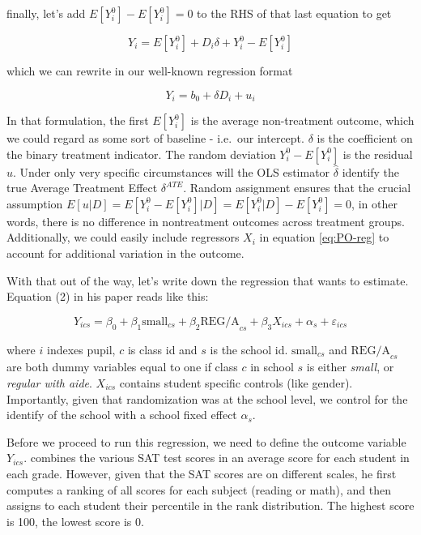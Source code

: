 \documentclass[]{book}
\begin{document}
finally, let's add \(E[Y_i^0] - E[Y_i^0]=0\) to the RHS of that last
equation to get

\begin{equation*}
Y_i = E[Y_i^0] + D_i \delta + Y_i^0 - E[Y_i^0]  
\end{equation*}

which we can rewrite in our well-known regression format

\begin{equation}
Y_i = b_0 + \delta D_i  + u_i  \label{eq:PO-reg}
\end{equation}

In that formulation, the first \(E[Y_i^0]\) is the average non-treatment
outcome, which we could regard as some sort of baseline - i.e.~our
intercept. \(\delta\) is the coefficient on the binary treatment
indicator. The random deviation \(Y_i^0 - E[Y_i^0]\) is the residual
\(u\). Under only very specific circumstances will the OLS estimator
\(\hat{\delta}\) identify the true Average Treatment Effect
\(\delta^{ATE}\). Random assignment ensures that the crucial assumption
\(E[u|D] = E[Y_i^0 - E[Y_i^0]|D] = E[Y_i^0|D] - E[Y_i^0] = 0\), in other
words, there is no difference in nontreatment outcomes across treatment
groups. Additionally, we could easily include regressors \(X_i\) in
equation \eqref{eq:PO-reg} to account for additional variation in the
outcome.

With that out of the way, let's write down the regression that
\citet{krueger1999} wants to estimate. Equation (2) in his paper reads
like this:

\begin{equation}
Y_{ics} = \beta_0 + \beta_1 \text{small}_{cs} + \beta_2 \text{REG/A}_{cs} + \beta_3 X_{ics} + \alpha_s + \varepsilon_{ics} \label{eq:krueger2}
\end{equation}

where \(i\) indexes pupil, \(c\) is class id and \(s\) is the school id.
\(\text{small}_{cs}\) and \(\text{REG/A}_{cs}\) are both dummy variables
equal to one if class \(c\) in school \(s\) is either \emph{small}, or
\emph{regular with aide}. \(X_{ics}\) contains student specific controls
(like gender). Importantly, given that randomization was at the school
level, we control for the identify of the school with a school fixed
effect \(\alpha_s\).

Before we proceed to run this regression, we need to define the outcome
variable \(Y_{ics}\). \citet{krueger1999} combines the various SAT test
scores in an average score for each student in each grade. However,
given that the SAT scores are on different scales, he first computes a
ranking of all scores for each subject (reading or math), and then
assigns to each student their percentile in the rank distribution. The
highest score is 100, the lowest score is 0.
\end{document}
